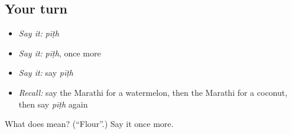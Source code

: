 \subsection*{Your turn}
\begin{itemize}
\raggedright
  \item \emph{Say it:} \emph{pīṭh}
  \item \emph{Say it:} \emph{pīṭh}, once more
  \item \emph{Say it:} say \emph{pīṭh}
  \item \emph{Recall:} say the Marathi for a watermelon, then the Marathi for a coconut, then say \emph{pīṭh} again
\end{itemize}

\begin{tcolorbox}[breakable,colback=teal!4,colframe=teal!35!black,title={Before you move on}]
What does  mean? (\textquotedblleft{}Flour\textquotedblright{}.) Say it once more.
\end{tcolorbox}
